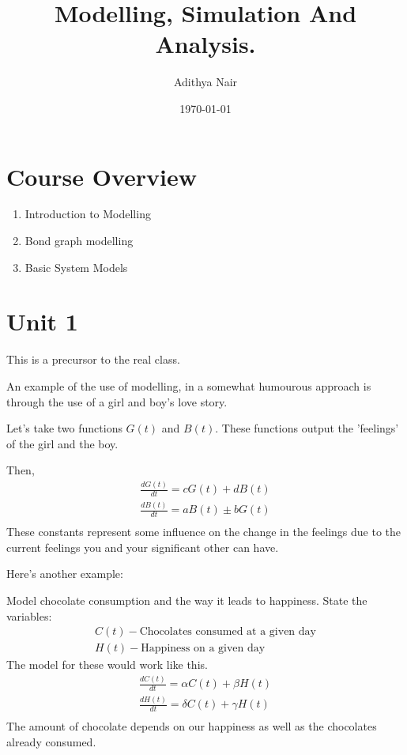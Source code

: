 \documentclass[11pt]{report}
\author{Adithya Nair}
\date{\today}
\title{Modelling, Simulation And Analysis.}
\begin{document}
\maketitle
\tableofcontents

\part{Course Overview}
\label{course-overview}
\begin{enumerate}
\item Introduction to Modelling

\item Bond graph modelling

\item Basic System Models
\end{enumerate}
\part{Unit 1}
\label{sec:org881ffdb}
This is a precursor to the real class.

An example of the use of modelling, in a somewhat humourous approach is
through the use of a girl and boy's love story.

Let's take two functions \(G(t)\) and \(B(t)\). These functions output
the 'feelings' of the girl and the boy.

Then, \[\begin{aligned}
    \frac{dG(t)}{dt} = cG(t) + dB(t) \\
    \frac{dB(t)}{dt} = aB(t) \pm bG(t) \\
\end{aligned}\] These constants represent some influence on the change
in the feelings due to the current feelings you and your significant
other can have.

Here's another example:

Model chocolate consumption and the way it leads to happiness. State the
variables: \[\begin{aligned}
    C(t) - \text{Chocolates consumed at a given day}\\
    H(t) - \text{Happiness on a given day}
\end{aligned}\] The model for these would work like this.
\[\begin{aligned}
    \frac{dC(t)}{dt} = \alpha C(t) + \beta H(t) \\
    \frac{dH(t)}{dt} = \delta C(t) + \gamma H(t) \\
\end{aligned}\] The amount of chocolate depends on our happiness as well
as the chocolates already consumed.
\end{document}

